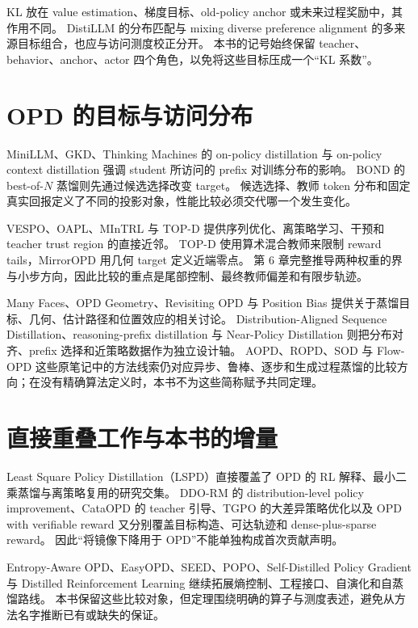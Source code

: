 KL 放在 value estimation、梯度目标、old-policy anchor 或未来过程奖励中，其作用不同\cite{designkl25,rethinkkl25,futurekl26}。
DistiLLM 的分布匹配与 mixing diverse preference alignment 的多来源目标组合，也应与访问测度校正分开\cite{distillm24,mpopref25}。
本书的记号始终保留 teacher、behavior、anchor、actor 四个角色，以免将这些目标压成一个“KL 系数”。

\section{OPD 的目标与访问分布}
MiniLLM、GKD、Thinking Machines 的 on-policy distillation 与 on-policy context distillation 强调 student 所访问的 prefix 对训练分布的影响\cite{minillm23,gkd23,tmopd25,contextopd26}。
BOND 的 best-of-$N$ 蒸馏则先通过候选选择改变 target\cite{bond24}。
候选选择、教师 token 分布和固定真实回报定义了不同的投影对象，性能比较必须交代哪一个发生变化。

VESPO、OAPL、MInTRL 与 TOP-D 提供序列优化、离策略学习、干预和 teacher trust region 的直接近邻\cite{vespo26,oapl26,mintrl26,topd26}。
TOP-D 使用算术混合教师来限制 reward tails，MirrorOPD 用几何 target 定义近端零点。
第 6 章完整推导两种权重的界与小步方向，因此比较的重点是尾部控制、最终教师偏差和有限步轨迹。

Many Faces、OPD Geometry、Revisiting OPD 与 Position Bias 提供关于蒸馏目标、几何、估计路径和位置效应的相关讨论\cite{manyfaces26,opdgeometry26,revisitopd26,iwopd26}。
Distribution-Aligned Sequence Distillation、reasoning-prefix distillation 与 Near-Policy Distillation 则把分布对齐、prefix 选择和近策略数据作为独立设计轴\cite{dasd26,prefixopd26,nearopd26}。
AOPD、ROPD、SOD 与 Flow-OPD 这些原笔记中的方法线索仍对应异步、鲁棒、逐步和生成过程蒸馏的比较方向；在没有精确算法定义时，本书不为这些简称赋予共同定理。

\section{直接重叠工作与本书的增量}
Least Square Policy Distillation（LSPD）直接覆盖了 OPD 的 RL 解释、最小二乘蒸馏与离策略复用的研究交集\cite{lspd26}。
DDO-RM 的 distribution-level policy improvement、CataOPD 的 teacher 引导、TGPO 的大差异策略优化以及 OPD with verifiable reward 又分别覆盖目标构造、可达轨迹和 dense-plus-sparse reward\cite{ddorm26,cataopd26,tgpo26,opdvr26}。
因此“将镜像下降用于 OPD”不能单独构成首次贡献声明。

Entropy-Aware OPD、EasyOPD、SEED、POPO、Self-Distilled Policy Gradient 与 Distilled Reinforcement Learning 继续拓展熵控制、工程接口、自演化和自蒸馏路线\cite{entropyopd26,easyopd26,seed26,popo26,sdpg26,distrl26}。
本书保留这些比较对象，但定理围绕明确的算子与测度表述，避免从方法名字推断已有或缺失的保证。

